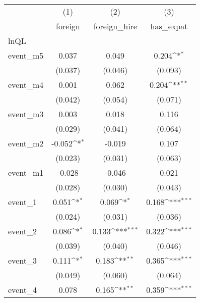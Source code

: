 {
\def\sym#1{\ifmmode^{#1}\else\(^{#1}\)\fi}
\begin{tabular}{l*{3}{c}}
\hline\hline
            &\multicolumn{1}{c}{(1)}&\multicolumn{1}{c}{(2)}&\multicolumn{1}{c}{(3)}\\
            &\multicolumn{1}{c}{foreign}&\multicolumn{1}{c}{foreign\_hire}&\multicolumn{1}{c}{has\_expat}\\
\hline
lnQL        &                     &                     &                     \\
event\_m5    &       0.037         &       0.049         &       0.204\sym{*}  \\
            &     (0.037)         &     (0.046)         &     (0.093)         \\
[1em]
event\_m4    &       0.001         &       0.062         &       0.204\sym{**} \\
            &     (0.042)         &     (0.054)         &     (0.071)         \\
[1em]
event\_m3    &       0.003         &       0.018         &       0.116         \\
            &     (0.029)         &     (0.041)         &     (0.064)         \\
[1em]
event\_m2    &      -0.052\sym{*}  &      -0.019         &       0.107         \\
            &     (0.023)         &     (0.031)         &     (0.063)         \\
[1em]
event\_m1    &      -0.028         &      -0.046         &       0.021         \\
            &     (0.028)         &     (0.030)         &     (0.043)         \\
[1em]
event\_1     &       0.051\sym{*}  &       0.069\sym{*}  &       0.168\sym{***}\\
            &     (0.024)         &     (0.031)         &     (0.036)         \\
[1em]
event\_2     &       0.086\sym{*}  &       0.133\sym{***}&       0.322\sym{***}\\
            &     (0.039)         &     (0.040)         &     (0.046)         \\
[1em]
event\_3     &       0.111\sym{*}  &       0.183\sym{**} &       0.365\sym{***}\\
            &     (0.049)         &     (0.060)         &     (0.064)         \\
[1em]
event\_4     &       0.078         &       0.165\sym{**} &       0.359\sym{***}\\

\end{tabular}}
